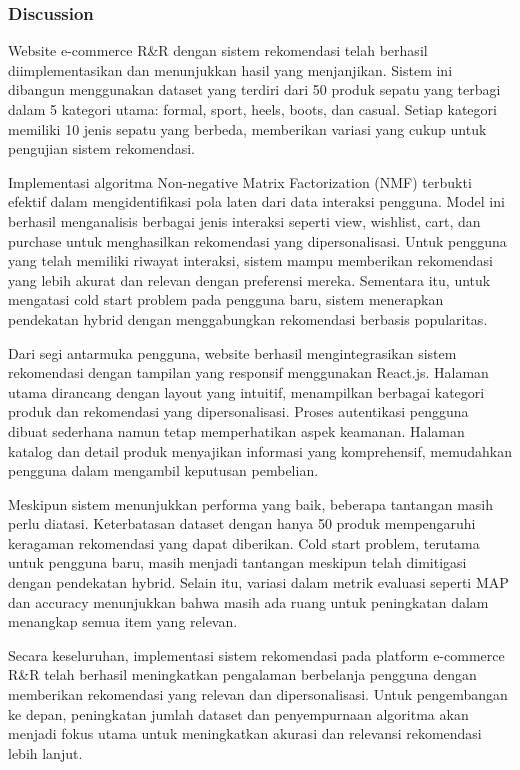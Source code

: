 \documentclass[journal,article,submit,pdftex,moreauthors]{Definitions/mdpi}
\begin{document}
\begin{itemize}
\subsubsection{Discussion}

Website e-commerce R\&R dengan sistem rekomendasi telah berhasil diimplementasikan dan menunjukkan hasil yang menjanjikan. Sistem ini dibangun menggunakan dataset yang terdiri dari 50 produk sepatu yang terbagi dalam 5 kategori utama: formal, sport, heels, boots, dan casual. Setiap kategori memiliki 10 jenis sepatu yang berbeda, memberikan variasi yang cukup untuk pengujian sistem rekomendasi.

Implementasi algoritma Non-negative Matrix Factorization (NMF) terbukti efektif dalam mengidentifikasi pola laten dari data interaksi pengguna. Model ini berhasil menganalisis berbagai jenis interaksi seperti view, wishlist, cart, dan purchase untuk menghasilkan rekomendasi yang dipersonalisasi. Untuk pengguna yang telah memiliki riwayat interaksi, sistem mampu memberikan rekomendasi yang lebih akurat dan relevan dengan preferensi mereka. Sementara itu, untuk mengatasi cold start problem pada pengguna baru, sistem menerapkan pendekatan hybrid dengan menggabungkan rekomendasi berbasis popularitas.

Dari segi antarmuka pengguna, website berhasil mengintegrasikan sistem rekomendasi dengan tampilan yang responsif menggunakan React.js. Halaman utama dirancang dengan layout yang intuitif, menampilkan berbagai kategori produk dan rekomendasi yang dipersonalisasi. Proses autentikasi pengguna dibuat sederhana namun tetap memperhatikan aspek keamanan. Halaman katalog dan detail produk menyajikan informasi yang komprehensif, memudahkan pengguna dalam mengambil keputusan pembelian.

Meskipun sistem menunjukkan performa yang baik, beberapa tantangan masih perlu diatasi. Keterbatasan dataset dengan hanya 50 produk mempengaruhi keragaman rekomendasi yang dapat diberikan. Cold start problem, terutama untuk pengguna baru, masih menjadi tantangan meskipun telah dimitigasi dengan pendekatan hybrid. Selain itu, variasi dalam metrik evaluasi seperti MAP dan accuracy menunjukkan bahwa masih ada ruang untuk peningkatan dalam menangkap semua item yang relevan.

Secara keseluruhan, implementasi sistem rekomendasi pada platform e-commerce R\&R telah berhasil meningkatkan pengalaman berbelanja pengguna dengan memberikan rekomendasi yang relevan dan dipersonalisasi. Untuk pengembangan ke depan, peningkatan jumlah dataset dan penyempurnaan algoritma akan menjadi fokus utama untuk meningkatkan akurasi dan relevansi rekomendasi lebih lanjut.\end{itemize}
  
\end{document}
